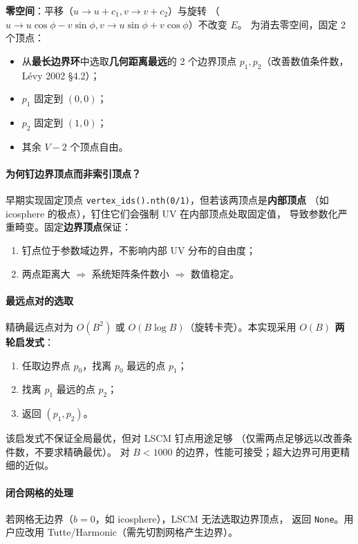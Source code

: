 \documentclass[11pt,a4paper]{article}
\begin{document}
\textbf{零空间}：平移（$u \to u + c_1, v \to v + c_2$）与旋转
（$u \to u\cos\phi - v\sin\phi, v \to u\sin\phi + v\cos\phi$）不改变 $E$。
为消去零空间，固定 2 个顶点：
\begin{itemize}
  \item 从\textbf{最长边界环}中选取\textbf{几何距离最远}的 2 个边界顶点
        $p_1, p_2$（改善数值条件数，Lévy 2002 §4.2）；
  \item $p_1$ 固定到 $(0, 0)$；
  \item $p_2$ 固定到 $(1, 0)$；
  \item 其余 $V - 2$ 个顶点自由。
\end{itemize}

\paragraph{为何钉边界顶点而非索引顶点？}
早期实现固定顶点 \texttt{vertex\_ids().nth(0/1)}，但若该两顶点是\textbf{内部顶点}
（如 icosphere 的极点），钉住它们会强制 UV 在内部顶点处取固定值，
导致参数化严重畸变。固定\textbf{边界顶点}保证：
\begin{enumerate}
  \item 钉点位于参数域边界，不影响内部 UV 分布的自由度；
  \item 两点距离大 $\Rightarrow$ 系统矩阵条件数小 $\Rightarrow$ 数值稳定。
\end{enumerate}

\paragraph{最远点对的选取}
精确最远点对为 $O(B^2)$ 或 $O(B \log B)$（旋转卡壳）。本实现采用
\textbf{$O(B)$ 两轮启发式}：
\begin{enumerate}
  \item 任取边界点 $p_0$，找离 $p_0$ 最远的点 $p_1$；
  \item 找离 $p_1$ 最远的点 $p_2$；
  \item 返回 $(p_1, p_2)$。
\end{enumerate}
该启发式不保证全局最优，但对 LSCM 钉点用途足够
（仅需两点足够远以改善条件数，不要求精确最优）。
对 $B < 1000$ 的边界，性能可接受；超大边界可用更精细的近似。

\paragraph{闭合网格的处理}
若网格无边界（$b = 0$，如 icosphere），LSCM 无法选取边界顶点，
返回 \texttt{None}。用户应改用 Tutte/Harmonic（需先切割网格产生边界）。
\end{document}
